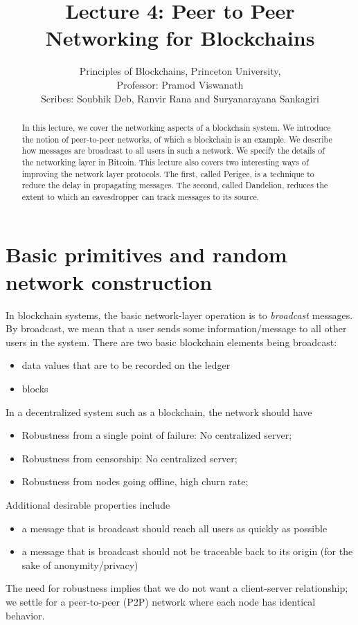 \documentclass{article}
\title{Lecture 4:  Peer to Peer Networking for Blockchains}
\author{Principles of Blockchains, Princeton University,  \\ Professor:  Pramod Viswanath \\ Scribes: Soubhik Deb, Ranvir Rana and  Suryanarayana Sankagiri}
\begin{document}
\maketitle

\begin{abstract}
In this lecture, we cover the networking aspects of a blockchain system. We introduce the notion of peer-to-peer networks, of which a blockchain is an example. We describe how messages are broadcast to all users in such a network. We specify the details of the networking layer in Bitcoin. This lecture also covers two interesting ways of improving the network layer protocols. The first, called \textsf{Perigee}, is a technique to reduce the delay in propagating messages. The second, called \textsf{Dandelion}, reduces the extent to which an eavesdropper can track messages to its source.
\end{abstract}

\section*{Basic primitives and random network construction}
In blockchain systems, the basic network-layer operation is to {\em broadcast} messages. By broadcast, we mean that a user sends some information/message to all other users in the system. There are two basic blockchain elements being broadcast:
\begin{itemize}
    \item data values that are to be recorded on the ledger
    \item blocks
\end{itemize}

In a decentralized system such as a blockchain, the network should have
\begin{itemize}
    \item Robustness from a single point of failure: No centralized server;  
    \item Robustness from censorship: No centralized server; 
    \item Robustness from nodes going offline, high churn rate; 
\end{itemize}
Additional desirable properties include
\begin{itemize}
    \item a message that is broadcast should reach all users as quickly as possible
    \item a message that is broadcast should not be traceable back to its origin (for the sake of anonymity/privacy)
\end{itemize}
The need for robustness implies that we do not want a client-server relationship; we settle for a peer-to-peer (P2P) network where each node has identical behavior.
\end{document}
